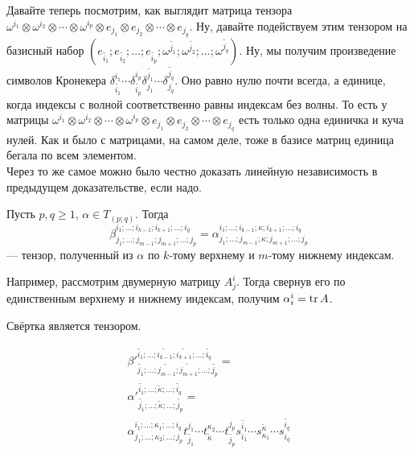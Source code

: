 \documentclass{article}
\begin{document}
\begin{itemize}
\begin{Comment}
            Давайте теперь посмотрим, как выглядит матрица тензора $\omega^{i_1}\otimes\omega^{i_2}\otimes\cdots\otimes\omega^{i_p}\otimes e_{j_1}\otimes e_{j_2}\otimes\cdots\otimes e_{j_q}$. Ну, давайте подействуем этим тензором на базисный набор $(e_{\widetilde{i_1}};e_{\widetilde{i_2}};\ldots;e_{\widetilde{i_p}};\omega^{\widetilde{j_1}};\omega^{\widetilde{j_2}};\ldots;\omega^{\widetilde{j_q}})$. Ну, мы получим произведение символов Кронекера $\delta_{\widetilde{i_1}}^{i_1}\cdots\delta_{\widetilde{i_p}}^{i_p}\delta^{\widetilde{j_1}}_{j_1}\cdots\delta^{\widetilde{j_q}}_{j_q}$. Оно равно нулю почти всегда, а единице, когда индексы с волной соответственно равны индексам без волны. То есть у матрицы $\omega^{i_1}\otimes\omega^{i_2}\otimes\cdots\otimes\omega^{i_p}\otimes e_{j_1}\otimes e_{j_2}\otimes\cdots\otimes e_{j_q}$ есть только одна единичка и куча нулей. Как и было с матрицами, на самом деле, тоже в базисе матриц единица бегала по всем элементом.\\
            Через то же самое можно было честно доказать линейную независимость в предыдущем доказательстве, если надо.
        \end{Comment}
        \dfn Пусть $p,q\geqslant1$, $\alpha\in T_{(p;q)}$. Тогда  $$
        \beta^{i_1;\ldots;i_{k-1};i_{k+1};\ldots;i_q}_{j_1;\ldots;j_{m-1};j_{m+1};\ldots;j_p}=
        \alpha^{i_1;\ldots;i_{k-1};\kappa;i_{k+1};\ldots;i_q}_{j_1;\ldots;j_{m-1};\kappa;j_{m+1};\ldots;j_p}
        $$ --- тензор, полученный из $\alpha$  по $k$-тому верхнему и $m$-тому нижнему индексам.
        \begin{Example}
            Например, рассмотрим двумерную матрицу $A^i_j$. Тогда свернув его по единственным верхнему и нижнему индексам, получим $\alpha_i^i=\operatorname{tr} A$.
        \end{Example}
        \thm Свёртка является тензором.
        \begin{Proof}
            \[
            \begin{split}
                {\beta'}^{\widetilde{i_1};\ldots;\widetilde{i_{k-1}};\widetilde{i_{k+1}};\ldots;\widetilde{i_q}}_{\widetilde{j_1};\ldots;\widetilde{j_{m-1}};\widetilde{j_{m+1}};\ldots;\widetilde{j_p}}=\\
                {\alpha'}^{\widetilde{i_1};\ldots;\widetilde\kappa;\ldots;\widetilde{i_q}}_{\widetilde{j_1};\ldots;\widetilde\kappa;\ldots;\widetilde{j_p}}=\\
                \alpha^{i_1;\ldots;\kappa_1;\ldots;i_q}_{j_1;\ldots;\kappa_2;\ldots;j_p}t_{\widetilde{j_1}}^{j_1}\cdots t_{\widetilde\kappa}^{\kappa_2}\cdots t_{\widetilde{j_p}}^{j_p}s_{i_1}^{\widetilde{i_1}}\cdots s_{\kappa_1}^{\widetilde\kappa}\cdots s_{i_q}^{\widetilde{i_q}}

\end{split}\]
\end{Proof}
\end{itemize}
\end{document}
